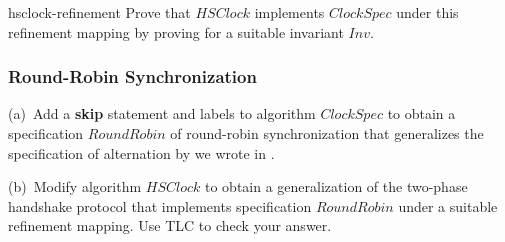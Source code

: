 \documentclass[fleqn,leqno]{article}
\begin{document}
\begin{hquestion}{hsclock-refinement}
Prove that $HSClock$ implements $ClockSpec$ under this refinement
mapping by proving  for a suitable
invariant $Inv$.
\end{hquestion}



\subsubsection{Round-Robin Synchronization}


\begin{question}
(a)~Add a \textbf{skip} statement and labels to algorithm $ClockSpec$
to obtain a specification $RoundRobin$ of round-robin synchronization
that generalizes the specification of alternation by
 we wrote in
.

(b)~Modify algorithm $HSClock$ to obtain a generalization of the
two-phase handshake protocol that implements specification
$RoundRobin$ under a suitable refinement mapping.  Use TLC to check
your answer.
\end{question}

\end{document}

